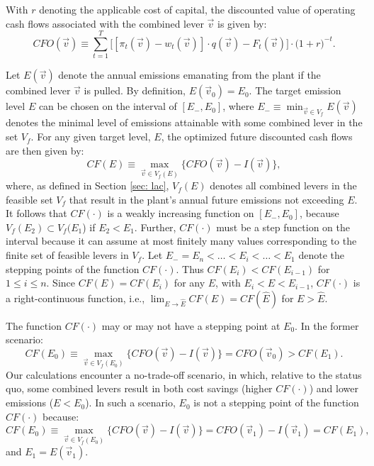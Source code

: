 \documentclass[12pt, a4paper]{article} %
\begin{document}
With $r$ denoting the applicable cost of capital, the discounted value of operating cash flows associated with the combined lever $\vec{v}$ is given by:
\begin{equation}
CFO(\vec{v}) \equiv \sum_{t=1}^{T} \bigl[[\pi_t(\vec{v}) - w_t(\vec{v})] \cdot q(\vec{v}) - F_t(\vec{v})\bigr] \cdot \bigl(1+r\bigr)^{-t}.
\end{equation}

Let $E(\vec{v})$ denote the annual emissions emanating from the plant if the combined lever $\vec{v}$ is pulled. By definition, $E(\vec{v}_0) = E_0$. The target emission level $E$ can be chosen on the interval of $[E_-, E_0]$, where $E_- \equiv \min_{\vec{v} \in V_f}{E(\vec{v})}$ denotes the minimal level of emissions attainable with some combined lever in the set $V_f$. For any given target level, $E$, the optimized future discounted cash flows are then given by:
\begin{equation}
CF(E) \equiv \max_{\vec{v} \in V_f(E)}{\{CFO(\vec{v}) - I(\vec{v})\}},
\end{equation}
where, as defined in Section \ref{sec: lac}, $V_f(E)$ denotes all combined levers in the feasible set $V_f$ that result in the plant's annual future emissions not exceeding $E$.  It follows that $CF(\cdot)$ is a weakly increasing function on $[E_-, E_0]$, because $V_f(E_2) \subset V_f(E_1$) if $E_2 < E_1$. Further, $CF(\cdot)$ must be a step function on the interval because it can assume at most finitely many values corresponding to the finite set of feasible levers in $V_f$. Let $E_- = E_n < \ldots < E_i < \ldots < E_1$ denote the stepping points of the function $CF(\cdot)$. Thus $CF(E_i) < CF(E_{i-1})$ for $1\leq i \leq n$. Since $CF(E) = CF(E_i)$  for any $E$, with $E_{i} < E < E_{i-1}$, $CF(\cdot)$ is a right-continuous function, i.e.,  $\lim_{E \to \hat{E}} CF(E) = CF(\hat{E})$ for $E > \hat{E}$.

The function $CF(\cdot)$ may or may not have a stepping point at $E_0$. In the former scenario:
$$ CF(E_0) \equiv \max_{\vec{v} \in V_f(E_0)}{\{CFO(\vec{v}) - I(\vec{v})\}}= CFO(\vec{v}_0) > CF(E_1).$$
Our calculations encounter a no-trade-off scenario, in which, relative to the status quo, some combined levers result in both cost savings (higher $CF(\cdot)$) and lower emissions ($E < E_0$). In such a scenario, $E_0$ is not a stepping point of the function $CF(\cdot)$ because:
\begin{equation}
\label{eq1}
CF(E_0) \equiv \max_{\vec{v} \in V_f(E_0)}{\{CFO(\vec{v}) - I(\vec{v})\}} = CFO(\vec{v}_1) - I(\vec{v}_1) = CF(E_1),
\end{equation}
and $E_1=E(\vec{v}_1)$.
\end{document}
